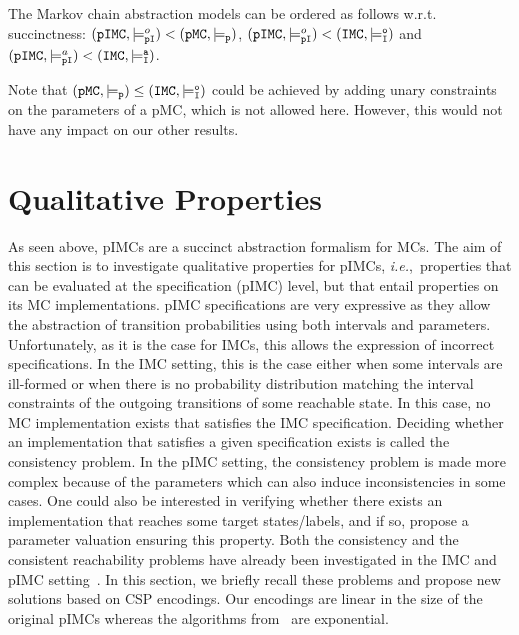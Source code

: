\documentclass{llncs}
\newcommand{\mc}{\textnormal{MC}}
\newcommand{\imc}{\textnormal{IMC}}
\newcommand{\pimc}{\textnormal{pIMC}}
\newcommand{\pmc}{\textnormal{pMC}}
\newcommand{\pmcSet}{\ensuremath{\tt{pMC}}}
\newcommand{\imcSet}{\ensuremath{\tt{IMC}}}
\newcommand{\pimcSet}{\ensuremath{\tt{pIMC}}}
\newcommand{\satisfactionImcOnce}{\ensuremath{\models^{o}_{\tt{I}}}}
\newcommand{\satisfactionImc}{\ensuremath{\models^{a}_{\tt{I}}}}
\newcommand{\satisfactionPmc}{\ensuremath{\models_{\tt{p}}}}
\newcommand{\satisfactionPimc}{\ensuremath{\models^a_{\tt{pI}}}}
\newcommand{\satisfactionPimcOnce}{\ensuremath{\models^o_{\tt{pI}}}}
\newcommand{\ie} {{\em i.e.},\ }
\newcommand{\toedit}[1]{{\color{red}#1}}
\begin{document}
\begin{proposition}\label{prop:sunccinctness_pimc_pmc_imc}
The Markov chain abstraction models can be ordered as follows w.r.t.
succinctness:
$({\pimcSet},\satisfactionPimcOnce) < (\pmcSet, \satisfactionPmc)$,
$({\pimcSet},\satisfactionPimcOnce) < (\imcSet, \satisfactionImcOnce)$ and
$({\pimcSet},\satisfactionPimc\nobreak) < (\imcSet, \satisfactionImc)$.
\end{proposition}

Note that $(\pmcSet, \satisfactionPmc) \le (\imcSet, \satisfactionImcOnce)$ could be achieved by adding unary constraints on the parameters of a {\pmc}, which is not allowed here. However, this would not have any impact on our other results.

\section{Qualitative Properties}\label{sec:qualitative-reachability}


As seen above, {\pimc}s are a succinct abstraction formalism for
{\mc}s. The aim of this section is to investigate qualitative
properties for {\pimc}s, \ie properties that can be evaluated at the
specification ({\pimc}) level, but that entail properties on its {\mc}
implementations.
%
{\pimc} specifications are very expressive as they allow the abstraction of
transition probabilities using both intervals and
parameters. Unfortunately, as it is the case for {\imc}s, this allows the
expression of incorrect specifications. In the {\imc} setting, this is
the case either when some intervals are ill-formed or when there is no
probability distribution matching the interval constraints of the
outgoing transitions of some reachable state. In this case, no {\mc}
implementation exists that satisfies the {\imc} specification. 
Deciding
whether an implementation 
that satisfies a given specification
exists  is
called the consistency problem. In the {\pimc} setting, the
consistency problem is made more complex because of the parameters
which can also induce inconsistencies in some cases. One could also be
interested in verifying whether there exists an implementation that
reaches some target states/labels, and if so, propose a parameter
valuation ensuring this property. Both the consistency and the
consistent reachability problems have already been investigated in the
{\imc} and {\pimc} setting~\cite{Delahaye15,DelahayeLP16}. In this section,
we briefly recall these problems and propose new solutions  based on CSP encodings. Our encodings are linear in the size
of the original {\pimc}s whereas the algorithms
  from~\cite{Delahaye15,DelahayeLP16} are exponential.
\end{document}
